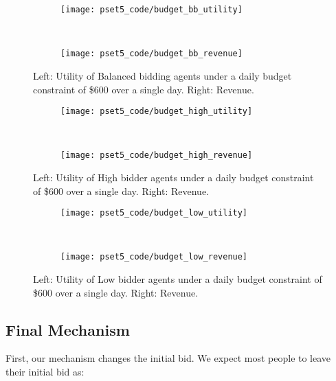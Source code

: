 \documentclass[11pt]{article}
\begin{document}
\begin{enumerate}[resume]
\begin{enumerate}
  \begin{figure*}[!h]
    \centering
      \begin{subfigure}{}
        \centering
       \texttt{[image: pset5\_code/budget\_bb\_utility]}
      \end{subfigure}
      ~
      \begin{subfigure}{}
        \centering
        \texttt{[image: pset5\_code/budget\_bb\_revenue]}
      \end{subfigure}
      \caption{Left: Utility of Balanced bidding agents under a daily budget constraint of \$600 over a single day. Right: Revenue.}
      \label{fig:budget_bb}
  \end{figure*}

  \begin{figure*}[!h]
    \centering
      \begin{subfigure}{}
        \centering
       \texttt{[image: pset5\_code/budget\_high\_utility]}
      \end{subfigure}
      ~
      \begin{subfigure}{}
        \centering
        \texttt{[image: pset5\_code/budget\_high\_revenue]}
      \end{subfigure}
      \caption{Left: Utility of High bidder agents under a daily budget constraint of \$600 over a single day. Right: Revenue.}
      \label{fig:budget_high}
  \end{figure*}

  \begin{figure*}[!h]
    \centering
      \begin{subfigure}{}
        \centering
       \texttt{[image: pset5\_code/budget\_low\_utility]}
      \end{subfigure}
      ~
      \begin{subfigure}{}
        \centering
        \texttt{[image: pset5\_code/budget\_low\_revenue]}
      \end{subfigure}
      \caption{Left: Utility of Low bidder agents under a daily budget constraint of \$600 over a single day. Right: Revenue.}
      \label{fig:budget_low}
  \end{figure*}


  \subsection*{Final Mechanism}
  \pagebreak
  First, our mechanism changes the initial bid. We expect most people to leave their initial bid as:


\end{enumerate}
\end{enumerate}
\end{document}
